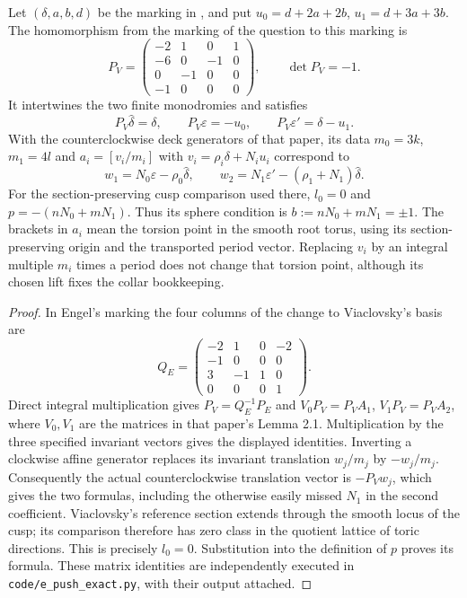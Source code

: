 \begin{proposition}\label{push:src:E.1.1}
Let $(\delta,a,b,d)$ be the marking in
\cite[Section 2, equations (2.1), (2.2), (2.7), (2.11)--(2.12)]{ViaclovskyLog2026},
and put $u_0=d+2a+2b$, $u_1=d+3a+3b$.
The homomorphism from the marking of the question to this marking is
\[
 P_V=\begin{pmatrix}
 -2&1&0&1\\-6&0&-1&0\\0&-1&0&0\\-1&0&0&0
 \end{pmatrix},\qquad \det P_V=-1.
\]
It intertwines the two finite monodromies and satisfies
\[
 P_V\widehat\delta=\delta,\qquad
 P_V\varepsilon=-u_0,\qquad
 P_V\varepsilon'=\delta-u_1.
\]
With the counterclockwise deck generators of that paper, its data
$m_0=3k$, $m_1=4l$ and
$a_i=[v_i/m_i]$ with $v_i=\rho_i\delta+N_i u_i$ correspond to
\[
 w_1=N_0\varepsilon-\rho_0\widehat\delta,
 \qquad
 w_2=N_1\varepsilon'-(\rho_1+N_1)\widehat\delta.
\]
For the section-preserving cusp comparison used there, $l_0=0$ and
$p=-(nN_0+mN_1)$.  Thus its sphere condition is
$b:=nN_0+mN_1=\pm1$.
The brackets in $a_i$ mean the torsion point in the smooth
root torus, using its section-preserving origin and the
transported period vector.  Replacing $v_i$ by an integral
multiple $m_i$ times a period does not change that torsion
point, although its chosen lift fixes the collar bookkeeping.
\end{proposition}

\begin{proof}
In Engel's marking the four columns of the change to Viaclovsky's
basis are
\[
 Q_E=\begin{pmatrix}-2&1&0&-2\\-1&0&0&0\\3&-1&1&0\\0&0&0&1\end{pmatrix}.
\]
Direct integral multiplication gives $P_V=Q_E^{-1}P_E$ and
$V_0P_V=P_VA_1$, $V_1P_V=P_VA_2$, where $V_0,V_1$ are the
matrices in that paper's Lemma 2.1.  Multiplication by the three
specified invariant vectors gives the displayed identities.
Inverting a clockwise affine generator replaces its invariant
translation $w_j/m_j$ by $-w_j/m_j$.  Consequently the actual
counterclockwise translation vector is $-P_Vw_j$, which gives the
two formulas, including the otherwise easily missed $N_1$ in the
second coefficient.  Viaclovsky's reference section extends through
the smooth locus of the cusp; its comparison therefore has zero
class in the quotient lattice of toric directions.  This is precisely
$l_0=0$.  Substitution into the definition of $p$ proves its formula.
These matrix identities are independently executed in
\texttt{code/e\_push\_exact.py}, with their output attached.
\end{proof}

